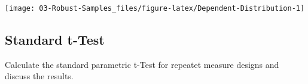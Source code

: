 \documentclass[
]{article}
\newenvironment{Shaded}{\begin{snugshade}}{\end{snugshade}}
\newcommand{\AttributeTok}[1]{\textcolor[rgb]{0.13,0.29,0.53}{#1}}
\newcommand{\DecValTok}[1]{\textcolor[rgb]{0.00,0.00,0.81}{#1}}
\newcommand{\FunctionTok}[1]{\textcolor[rgb]{0.13,0.29,0.53}{\textbf{#1}}}
\newcommand{\NormalTok}[1]{#1}
\newcommand{\SpecialCharTok}[1]{\textcolor[rgb]{0.81,0.36,0.00}{\textbf{#1}}}
\begin{document}
\begin{center}\texttt{[image: 03-Robust-Samples\_files/figure-latex/Dependent-Distribution-1]} \end{center}

\subsection*{Standard t-Test}\label{standard-t-test-1}

Calculate the standard parametric t-Test for repeatet measure designs and discuss the results.

\begin{Shaded}
\end{Shaded}
\end{document}
